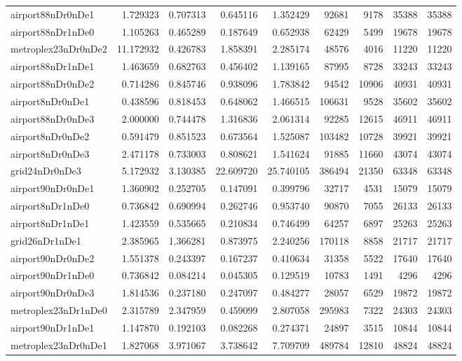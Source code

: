 \begin{longtable}{|l|r|r|r|r|r|r|r|r|}
airport88nDr0nDe1 & 1.729323 & 0.707313 & 0.645116 & 1.352429 & 92681 & 9178 & 35388 & 35388 \\
airport88nDr1nDe0 & 1.105263 & 0.465289 & 0.187649 & 0.652938 & 62429 & 5499 & 19678 & 19678 \\
metroplex23nDr0nDe2 & 11.172932 & 0.426783 & 1.858391 & 2.285174 & 48576 & 4016 & 11220 & 11220 \\
airport88nDr1nDe1 & 1.463659 & 0.682763 & 0.456402 & 1.139165 & 87995 & 8728 & 33243 & 33243 \\
airport88nDr0nDe2 & 0.714286 & 0.845746 & 0.938096 & 1.783842 & 94542 & 10906 & 40931 & 40931 \\
airport8nDr0nDe1 & 0.438596 & 0.818453 & 0.648062 & 1.466515 & 106631 & 9528 & 35602 & 35602 \\
airport88nDr0nDe3 & 2.000000 & 0.744478 & 1.316836 & 2.061314 & 92285 & 12615 & 46911 & 46911 \\
airport8nDr0nDe2 & 0.591479 & 0.851523 & 0.673564 & 1.525087 & 103482 & 10728 & 39921 & 39921 \\
airport8nDr0nDe3 & 2.471178 & 0.733003 & 0.808621 & 1.541624 & 91885 & 11660 & 43074 & 43074 \\
grid24nDr0nDe3 & 5.172932 & 3.130385 & 22.609720 & 25.740105 & 386494 & 21350 & 63348 & 63348 \\
airport90nDr0nDe1 & 1.360902 & 0.252705 & 0.147091 & 0.399796 & 32717 & 4531 & 15079 & 15079 \\
airport8nDr1nDe0 & 0.736842 & 0.690994 & 0.262746 & 0.953740 & 90870 & 7055 & 26133 & 26133 \\
airport8nDr1nDe1 & 1.423559 & 0.535665 & 0.210834 & 0.746499 & 64257 & 6897 & 25263 & 25263 \\
grid26nDr1nDe1 & 2.385965 & 1.366281 & 0.873975 & 2.240256 & 170118 & 8858 & 21717 & 21717 \\
airport90nDr0nDe2 & 1.551378 & 0.243397 & 0.167237 & 0.410634 & 31358 & 5522 & 17640 & 17640 \\
airport90nDr1nDe0 & 0.736842 & 0.084214 & 0.045305 & 0.129519 & 10783 & 1491 & 4296 & 4296 \\
airport90nDr0nDe3 & 1.814536 & 0.237180 & 0.247097 & 0.484277 & 28057 & 6529 & 19872 & 19872 \\
metroplex23nDr1nDe0 & 2.315789 & 2.347959 & 0.459099 & 2.807058 & 295983 & 7322 & 24303 & 24303 \\
airport90nDr1nDe1 & 1.147870 & 0.192103 & 0.082268 & 0.274371 & 24897 & 3515 & 10844 & 10844 \\
metroplex23nDr0nDe1 & 1.827068 & 3.971067 & 3.738642 & 7.709709 & 489784 & 12810 & 48824 & 48824 \\

\end{longtable}
